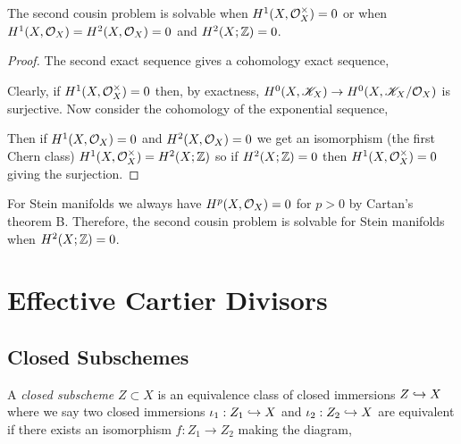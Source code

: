 \documentclass[12pt]{article}
\begin{document}
\begin{theorem}
The second cousin problem is solvable when $H^1(X, \mathcal{O}_{X}^\times) = 0$ or when $H^1(X, \mathcal{O}_{X}) = H^2(X, \mathcal{O}_{X}) = 0$ and $H^2(X; \mathbb{Z}) = 0$.
\end{theorem}

\begin{proof}
The second exact sequence gives a cohomology exact sequence,
\begin{center}
\end{center}
Clearly, if $H^1(X, \mathcal{O}_{X}^\times) = 0$ then, by exactness, $H^0(X, \mathscr{K}_X) \to H^0(X, \mathscr{K}_X / \mathcal{O}_{X})$ is surjective. Now consider the cohomology of the exponential sequence,
\begin{center}
\end{center}
Then if $H^1(X, \mathcal{O}_{X}) = 0$ and $H^2(X, \mathcal{O}_{X}) = 0$ we get an isomorphism (the first Chern class) $H^1(X, \mathcal{O}_{X}^\times) = H^2(X; \mathbb{Z})$ so if $H^2(X; \mathbb{Z}) = 0$ then $H^1(X, \mathcal{O}_{X}^\times) = 0$ giving the surjection. 
\end{proof}

\begin{rmk}
For Stein manifolds we always have $H^p(X, \mathcal{O}_{X}) = 0$ for $p > 0$ by Cartan's theorem B. Therefore, the second cousin problem is solvable for Stein manifolds when $H^2(X; \mathbb{Z}) = 0$. 
\end{rmk}


\section{Effective Cartier Divisors}

\subsection{Closed Subschemes}

\begin{defn}
A \textit{closed subscheme} $Z \subset X$ is an equivalence class of closed immersions $Z \hookrightarrow X$ where we say two closed immersions $\iota_1 : Z_1 \hookrightarrow X$ and $\iota_2 : Z_2 \hookrightarrow X$ are equivalent if there exists an isomorphism $f : Z_1 \to Z_2$ making the diagram,
\begin{center}
\end{center}
\end{defn}
\end{document}
